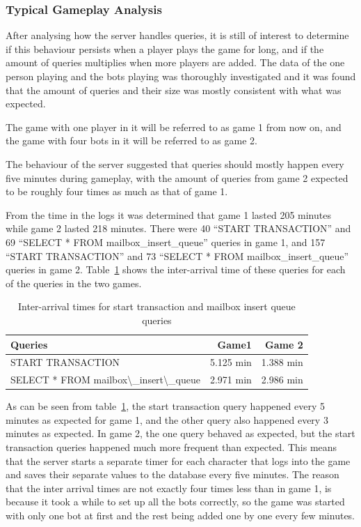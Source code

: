 \subsubsection{Typical Gameplay Analysis}

After analysing how the server handles queries, it is still of interest to determine if this behaviour persists when a player plays the game for long, and if the amount of queries multiplies when more players are added. The data of the one person playing and the bots playing was thoroughly investigated and it was found that the amount of queries and their size was mostly consistent with what was expected.

The game with one player in it will be referred to as game 1 from now on, and the game with four bots in it will be referred to as game 2.

The behaviour of the server suggested that queries should mostly happen every five minutes during gameplay, with the amount of queries from game 2 expected to be roughly four times as much as that of game 1.

From the time in the logs it was determined that game 1 lasted 205 minutes while game 2 lasted 218 minutes. There were 40 ``START TRANSACTION'' and 69 ``SELECT * FROM mailbox\_insert\_queue'' queries in game 1, and 157 ``START TRANSACTION'' and 73 ``SELECT * FROM mailbox\_insert\_queue'' queries in game 2. Table~\ref{botsres} shows the inter-arrival time of these queries for each of the queries in the two games.



\begin{table}[htbp]
  \centering
  \caption{Inter-arrival times for start transaction and mailbox insert queue queries}
    \begin{tabular}{lrr}
    \addlinespace
    \toprule
    \textbf{Queries} & \textbf{Game1} & \textbf{Game 2} \\
    \midrule

    START TRANSACTION & 5.125 min & 1.388 min \\
    \midrule
    SELECT * FROM mailbox\textbackslash \_insert\textbackslash \_queue & 2.971 min & 2.986 min \\
    \bottomrule
    \end{tabular}%
  \label{botsres}%
\end{table}%

As can be seen from table~\ref{botsres}, the start transaction query happened every 5 minutes as expected for game 1, and the other query also happened every 3 minutes as expected. In game 2, the one query behaved as expected, but the start transaction queries happened much more frequent than expected. This means that the server starts a separate timer for each character that logs into the game and saves their separate values to the database every five minutes. The reason that the inter arrival times are not exactly four times less than in game 1, is because it took a while to set up all the bots correctly, so the game was started with only one bot at first and the rest being added one by one every few minutes.

